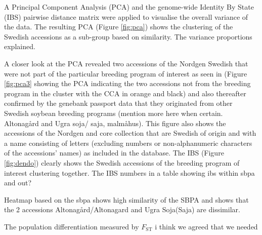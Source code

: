 \documentclass[9pt, onecolumn,twoside]{gsajnl}
\begin{document}
A Principal Component Analysis (PCA) and the genome-wide Identity By State (IBS) pairwise distance matrix were applied to visualise the overall variance of the data. The resulting PCA (Figure \ref{fig:pca}) shows the clustering of the Swedish accessions as a sub-group based on similarity. The variance proportions explained. 

A closer look at the PCA revealed two accessions of the Nordgen Swedish that were not part of the particular breeding program of interest as seen in (Figure \ref{fig:pca3}  showing the PCA indicating the two accessions not from the breeding program in the cluster with the CCA in orange and black)  and also thereafter confirmed by the genebank passport data that they originated from other Swedish soybean breeding programs (mention more here when certain. Altonagård and Ugra soja/ saja, malmåhus).  This figure also shows the accessions of the Nordgen and core collection that are Swedish of origin and with a name consisting of letters (excluding numbers or non-alphanumeric characters of the accessions' names) as included in the database. 
The IBS (Figure  \ref{fig:dendo}) clearly shows the Swedish accessions of the breeding program of interest clustering together. The  
 IBS numbers in a table showing ibs within sbpa and out?

 Heatmap based on the sbpa shows high similarity of the SBPA and shows that the 2 accessions Altonagård/Altonagard and Ugra Soja(Saja) are dissimilar. 

The population differentiation measured by $F_{\text{ST}}$
i think we agreed that we needed 
\end{document}
